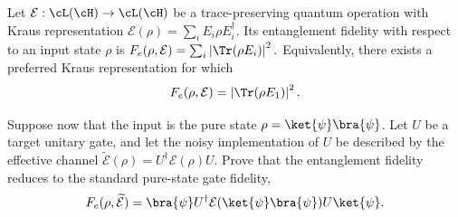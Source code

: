 Let $\mathcal{E}:\cL(\cH)\to \cL(\cH)$ be a trace-preserving quantum operation with Kraus representation $\mathcal{E}(\rho)=\sum_i E_i\rho E_i^\dagger.$ Its entanglement fidelity with respect to an input state $\rho$ is $F_e(\rho,\mathcal{E}) = \sum_i \left| \Tr(\rho E_i) \right|^2.$
Equivalently, there exists a preferred Kraus representation for which
$$
F_e(\rho,\mathcal{E})
=
\left|
\Tr(\rho E_1)
\right|^2.
$$

Suppose now that the input is the pure state $\rho=\ket{\psi}\bra{\psi}$. Let $U$ be a target unitary gate, and let the noisy implementation of $U$ be described by the effective channel $\widetilde{\mathcal{E}}(\rho) = U^\dagger \mathcal{E}(\rho) U$.
Prove that the entanglement fidelity reduces to the standard pure-state gate fidelity,
$$
F_e(\rho,\widetilde{\mathcal{E}})
=
\bra{\psi}
U^\dagger
\mathcal{E}(\ket{\psi}\bra{\psi})
U
\ket{\psi}.
$$
